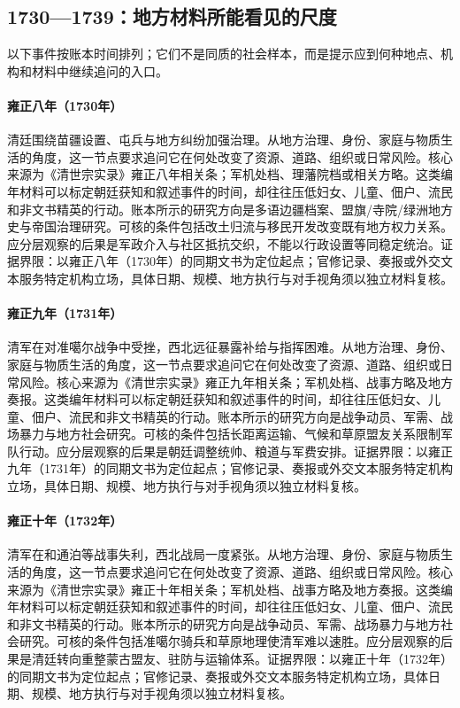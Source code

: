 \subsection{1730—1739：地方材料所能看见的尺度}
以下事件按账本时间排列；它们不是同质的社会样本，而是提示应到何种地点、机构和材料中继续追问的入口。
\hypertarget{social:EQ-1730-SOUTHWEST-MIAO-GOVERNANCE}{}\paragraph{雍正八年（1730年）}清廷围绕苗疆设置、屯兵与地方纠纷加强治理。从地方治理、身份、家庭与物质生活的角度，这一节点要求追问它在何处改变了资源、道路、组织或日常风险。核心来源为《清世宗实录》雍正八年相关条；军机处档、理藩院档或相关方略。这类编年材料可以标定朝廷获知和叙述事件的时间，却往往压低妇女、儿童、佃户、流民和非文书精英的行动。账本所示的研究方向是多语边疆档案、盟旗/寺院/绿洲地方史与帝国治理研究。可核的条件包括改土归流与移民开发改变既有地方权力关系。应分层观察的后果是军政介入与社区抵抗交织，不能以行政设置等同稳定统治。证据界限：以雍正八年（1730年）的同期文书为定位起点；官修记录、奏报或外交文本服务特定机构立场，具体日期、规模、地方执行与对手视角须以独立材料复核。
\hypertarget{social:EQ-1731-Dzungar-WAR-REVERSE}{}\paragraph{雍正九年（1731年）}清军在对准噶尔战争中受挫，西北远征暴露补给与指挥困难。从地方治理、身份、家庭与物质生活的角度，这一节点要求追问它在何处改变了资源、道路、组织或日常风险。核心来源为《清世宗实录》雍正九年相关条；军机处档、战事方略及地方奏报。这类编年材料可以标定朝廷获知和叙述事件的时间，却往往压低妇女、儿童、佃户、流民和非文书精英的行动。账本所示的研究方向是战争动员、军需、战场暴力与地方社会研究。可核的条件包括长距离运输、气候和草原盟友关系限制军队行动。应分层观察的后果是朝廷调整统帅、粮道与军费安排。证据界限：以雍正九年（1731年）的同期文书为定位起点；官修记录、奏报或外交文本服务特定机构立场，具体日期、规模、地方执行与对手视角须以独立材料复核。
\hypertarget{social:EQ-1732-KOBDO-BATTLE}{}\paragraph{雍正十年（1732年）}清军在和通泊等战事失利，西北战局一度紧张。从地方治理、身份、家庭与物质生活的角度，这一节点要求追问它在何处改变了资源、道路、组织或日常风险。核心来源为《清世宗实录》雍正十年相关条；军机处档、战事方略及地方奏报。这类编年材料可以标定朝廷获知和叙述事件的时间，却往往压低妇女、儿童、佃户、流民和非文书精英的行动。账本所示的研究方向是战争动员、军需、战场暴力与地方社会研究。可核的条件包括准噶尔骑兵和草原地理使清军难以速胜。应分层观察的后果是清廷转向重整蒙古盟友、驻防与运输体系。证据界限：以雍正十年（1732年）的同期文书为定位起点；官修记录、奏报或外交文本服务特定机构立场，具体日期、规模、地方执行与对手视角须以独立材料复核。
